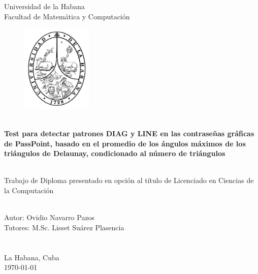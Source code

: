 \documentclass[12pt]{report}
\begin{document}
\begin{titlepage}
    \centering
    {\Huge {Universidad de la Habana}}\\[1cm]
    {\Huge {Facultad de Matemática y Computación }}\\[0.5cm]
 
    \begin{figure}[h]
    	\centering
    	\includegraphics[width=0.3\textwidth]{logoUH.png}
    \end{figure}
    {\noindent\hrulefill}\\[0.2cm]
    
    {\Large\textbf{{Test para detectar patrones DIAG y LINE  en las contraseñas gráficas de PassPoint, basado en el promedio de los ángulos máximos de los triángulos de Delaunay, condicionado al número de triángulos }}}\\[0.1cm]
    {\noindent\hrulefill}\\[1.0cm]
    \begin{minipage}{0.8\textwidth}
    \begin{center}
    	{\Large Trabajo de Diploma presentado en opción al título de Licenciado en Ciencias de la Computación}
    	
    \end{center}
    \end{minipage}\\[1cm]
    
    
 
    
    {\Large {Autor: Ovidio Navarro Pazos}}\\[2cm]
   	{\Large {Tutores: M.Sc. Lisset Suárez Plasencia}}\\
   	\\
   	\\
   	[2.0cm]
   	
   	{\large{La Habana, Cuba}}\\
    {\large  \today}
\end{titlepage}
\end{document}
